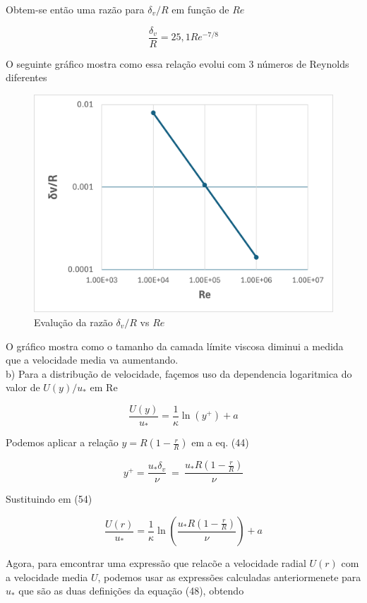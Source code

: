 \documentclass[12pt]{article}
\begin{document}
Obtem-se então uma razão para $\delta_v/R$ em função de $Re$

\begin{equation}
	\frac{\delta_v}{R} = 25,1 Re^{-7/8}
\end{equation}

O seguinte gráfico mostra como essa relação evolui com 3 números de Reynolds diferentes

\begin{figure}[H]
	\centering
	\includegraphics[width=.65\textwidth]{figures/1}
	\caption{Evalução da razão $\delta_v/R$ vs $Re$}
\end{figure}

O gráfico mostra como o tamanho da camada límite viscosa diminui a medida que a velocidade media va aumentando.\\

b) Para a distribução de velocidade, façemos uso da dependencia logaritmica do valor de $U(y)/u_*$ em Re

\begin{equation}
	\frac{U(y)}{u_*} = \frac{1}{\kappa} \ln\left( y^+ \right) + a
\end{equation}

Podemos aplicar a relação $y = R(1-\frac{r}{R})$ em a eq. (44)

\begin{equation}
	y^+  = \frac{u_*\delta_v}{\nu} \ = \ \frac{u_*R(1-\frac{r}{R})}{\nu}
\end{equation}

Sustituindo em (54)

\begin{equation}
	\frac{U(r)}{u_*} = \frac{1}{\kappa} \ln\left( \frac{u_*R(1-\frac{r}{R})}{\nu} \right) + a
\end{equation}

Agora, para emcontrar uma expressão que relacõe a velocidade radial $U(r)$ com a velocidade media $U$, podemos usar as expressões calculadas anteriormenete para $u_*$ que são as duas definições da equação (48), obtendo
\end{document}
